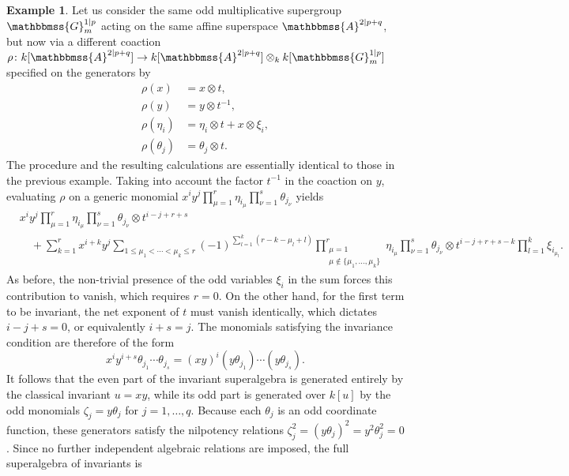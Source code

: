 \documentclass[11pt,a4paper,reqno,noamsfonts]{amsart}
\numberwithin{equation}{section}
\theoremstyle{definition}
\newtheorem{example}[theorem]{Example}
\theoremstyle{remark}
\renewcommand{\AA}{\ensuremath{\mathbbmss{A}}}
\newcommand{\GG}{\ensuremath{\mathbbmss{G}}}
\begin{document}
\begin{example}\label{ex:3.11}
Let us consider the same odd multiplicative supergroup $\GG_{m}^{1 \vert p}$ acting on the same affine superspace $\AA^{2 \vert p+q}$, but now via a different coaction $\rho \colon k[\AA^{2 \vert p+q}] \to k[\AA^{2 \vert p+q}] \otimes_k k[\GG_{m}^{1 \vert p}]$ specified on the generators by
$$
\begin{aligned}
\rho(x) &= x \otimes t, \\
\rho(y) &= y \otimes t^{-1}, \\
\rho(\eta_i) & = \eta_i \otimes t + x \otimes \xi_i, \\
\rho(\theta_j) &= \theta_j \otimes t.
\end{aligned}
$$
The procedure and the resulting calculations are essentially identical to those in the previous example. Taking into account the factor $t^{-1}$ in the coaction on $y$, evaluating $\rho$ on a generic monomial $x^i y^j \prod_{\mu=1}^r \eta_{i_\mu} \prod_{\nu=1}^s \theta_{j_\nu}$ yields
$$
\begin{aligned}
&x^{i} y^{j}  \prod_{\mu=1}^{r} \eta_{i_{\mu}} \prod_{\nu=1}^{s}\theta_{j_{\nu}}  \otimes t^{i - j + r + s} \\
 &\quad + \sum_{k = 1}^{r} x^{i + k} y^{j} \sum_{1 \leq \mu_1 < \cdots < \mu_k \leq r}(-1)^{\sum_{l=1}^{k} (r - k - \mu_l  +l)} \prod_{\substack{\mu=1 \\ \mu \not\in \{ \mu_1,\dots,\mu_k \}}}^{r} \eta_{i_{\mu}}   \prod_{\nu=1}^{s}\theta_{j_{\nu}}    \otimes t^{i - j+r+s-k} \prod_{l=1}^{k}  \xi_{i_{\mu_{l}}}.
\end{aligned}
$$
As before, the non-trivial presence of the odd variables $\xi_{i}$ in the sum forces this contribution to vanish, which requires $r = 0$. On the other hand, for the first term to be invariant, the net exponent of $t$ must vanish identically, which dictates $i - j + s = 0$, or equivalently $i + s =j$. The monomials satisfying the invariance condition are therefore of the form
$$
x^{i} y^{i + s}\theta_{j_1} \cdots \theta_{j_s} = (xy)^{i} ( y \theta_{j_1}) \cdots ( y \theta_{j_s}). 
$$ 
It follows that the even part of the invariant superalgebra is generated entirely by the classical invariant $u = xy$, while its odd part is generated over $k[u]$ by the odd monomials $\zeta_j = y \theta_j$ for $j = 1, \dots, q$. Because each $\theta_j$ is an odd coordinate function, these generators satisfy the nilpotency relations $\zeta_j^2 = (y\theta_j)^2 = y^2\theta_j^2 = 0$. Since no further independent algebraic relations are imposed, the full superalgebra of invariants is

\end{example}
\end{document}
